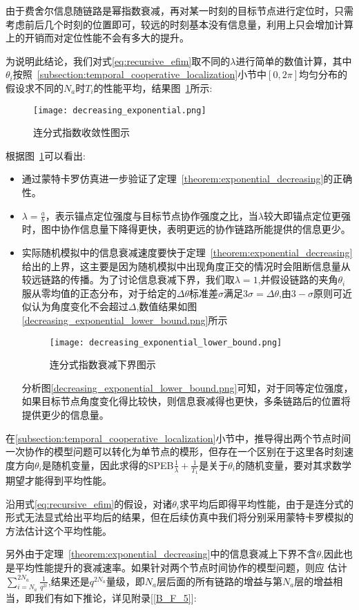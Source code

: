 \begin{remark}
由于费舍尔信息随链路是幂指数衰减，再对某一时刻的目标节点进行定位时，只需考虑前后几个时刻的位置即可，较远的时刻基本没有信息量，利用上只会增加计算上的开销而对定位性能不会有多大的提升。

为说明此结论，我们对式\ref{eq:recursive_efim}取不同的$\lambda$进行简单的数值计算，其中$\theta_i$按照~\ref{subsection:temporal_cooperative_localization}小节中$[0,2\pi]$均匀分布的假设求不同的$N_a$时$T_i$的性能平均，结果图~\ref{fig:continuous_fraction_exponential}所示:
\begin{figure}
  \centering
  \texttt{[image: decreasing\_exponential.png]}
  \caption{连分式指数收敛性图示}\label{fig:continuous_fraction_exponential}
\end{figure}
根据图~\ref{fig:continuous_fraction_exponential}可以看出:
\begin{itemize}
\item 通过蒙特卡罗仿真进一步验证了定理~\ref{theorem:exponential_decreasing}的正确性。
\item $\lambda=\frac{a}{b}$，表示锚点定位强度与目标节点协作强度之比，当$\lambda$较大即锚点定位更强时，图中协作信息量下降得更快，表明更远的协作链路所能提供的信息更少。
\item 实际随机模拟中的信息衰减速度要快于定理~\ref{theorem:exponential_decreasing}给出的上界，这主要是因为随机模拟中出现角度正交的情况时会阻断信息量从较远链路的传播。为了讨论信息衰减下界，我们取$\lambda=1$,并假设链路的夹角$\theta_i$服从零均值的正态分布，对于给定的$\Delta \theta$标准差$\sigma$满足$3\sigma=\Delta \theta$,由$3-\sigma$原则可近似认为角度变化不会超过$\Delta$,数值结果如图\ref{decreasing_exponential_lower_bound.png}所示
    \begin{figure}
      \centering
      \texttt{[image: decreasing\_exponential\_lower\_bound.png]}
      \caption{连分式指数衰减下界图示}\label{fig:continuous_fraction_exponential_lower_bound}
    \end{figure}
    分析图\ref{decreasing_exponential_lower_bound.png}可知，对于同等定位强度，如果目标节点角度变化得比较快，则信息衰减得也更快，多条链路后的位置将提供更少的信息量。
\end{itemize}
\end{remark}
\begin{remark}
在\ref{subsection:temporal_cooperative_localization}小节中，推导得出两个节点时间一次协作的模型问题可以转化为单节点的模形，但存在一个区别在于这里各时刻速度方向$\theta_i$是随机变量，因此求得的SPEB$\frac{1}{\lambda}+\frac{1}{T_1}$是关于$\theta_i$的随机变量，要对其求数学期望才能得到平均性能。

沿用式\ref{eq:recursive_efim}的假设，对诸$\theta_i$求平均后即得平均性能，由于是连分式的形式无法显式给出平均后的结果，但在后续仿真中我们将分别采用蒙特卡罗模拟的方法估计这个平均性能。

另外由于定理~\ref{theorem:exponential_decreasing}中的信息衰减上下界不含$\theta$,因此也是平均性能提升的衰减速率。如果针对两个节点时间协作的模型问题，则应
估计$\sum_{i=N_a}^{2N_a}\frac{1}{q^{2i}}$,结果还是$q^{2N_a}$量级，即$N_a$层后面的所有链路的增益与第$N_a$层的增益相当，即我们有如下推论，详见附录[\ref{B_F_5}]:
\end{remark}
